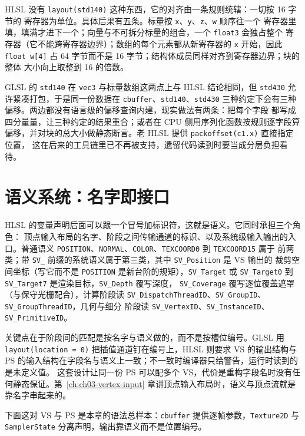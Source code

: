 \documentclass[12pt,a4paper,fontset=fandol]{ctexbook}
\newcommand{\Tp}[1]{\texttt{#1}}
\newcommand{\Lang}[1]{\textsf{#1}}
\newcommand{\DomCPU}{\Lang{CPU}}
\newcommand{\GSL}{\Lang{GLSL}}
\newcommand{\HSL}{\Lang{HLSL}}
\begin{document}
\HSL{} 没有 \Tp{layout(std140)} 这种东西，它的对齐由一条规则统辖：一切按 16 字节的
寄存器为单位。具体后果有五条。标量按 \Tp{x}、\Tp{y}、\Tp{z}、\Tp{w} 顺序往一个
寄存器里填，填满才进下一个；向量与不可拆分标量的组合，一个 \Tp{float3} 会独占整个
寄存器（它不能跨寄存器边界）；数组的每个元素都从新寄存器的 \Tp{x} 开始，因此
\Tp{float w[4]} 占 64 字节而不是 16 字节；结构体成员同样对齐到寄存器边界；块的整体
大小向上取整到 16 的倍数。

\GSL{} 的 \Tp{std140} 在 \Tp{vec3} 与标量数组这两点上与 \HSL{} 结论相同，但
\Tp{std430} 允许紧凑打包，于是同一份数据在 \Tp{cbuffer}、\Tp{std140}、\Tp{std430}
三种约定下会有三种偏移。两边都没有语言级的偏移查询内建，现实做法有两条：把每个字段
都写成四分量量，让三种约定的结果重合；或者在 \DomCPU{} 侧用序列化函数按规则逐字段算
偏移，并对块的总大小做静态断言。老 \HSL{} 提供 \Tp{packoffset(c1.x)} 直接指定位置，
这在后来的工具链里已不再被支持，遗留代码读到时要当成分层负担看待。

\section{语义系统：名字即接口}

\HSL{} 的变量声明后面可以跟一个冒号加标识符，这就是语义。它同时承担三个角色：
顶点输入布局的名字、阶段之间传输通道的标识、以及系统级输入输出的入口。普通语义
\Tp{POSITION}、\Tp{NORMAL}、\Tp{COLOR}、\Tp{TEXCOORD0} 到 \Tp{TEXCOORD15} 属于
前两类；带 \Tp{SV\_} 前缀的系统语义属于第三类，其中 \Tp{SV\_Position} 是 VS 输出的
裁剪空间坐标（写它而不是 \Tp{POSITION} 是新台阶的规矩），\Tp{SV\_Target} 或
\Tp{SV\_Target0} 到 \Tp{SV\_Target7} 是渲染目标，\Tp{SV\_Depth} 覆写深度，
\Tp{SV\_Coverage} 覆写逐位覆盖遮罩（与保守光栅配合），计算阶段读
\Tp{SV\_DispatchThreadID}、\Tp{SV\_GroupID}、\Tp{SV\_GroupThreadID}，几何与细分
阶段读 \Tp{SV\_VertexID}、\Tp{SV\_InstanceID}、\Tp{SV\_PrimitiveID}。

关键点在于阶段间的匹配是按名字与语义做的，而不是按槽位编号。\GSL{} 用
\Tp{layout(location = 0)} 把插值通道钉在编号上，\HSL{} 则要求 VS 的输出结构与 PS
的输入结构在字段名与语义上一致；不一致时编译器只给警告，运行时读到的是未定义值。
这套设计让同一份 PS 可以配多个 VS，代价是重构字段名时没有任何静态保证。第~\ref{ch:ch03-vertex-input}
章讲顶点输入布局时，语义与顶点流就是靠名字串起来的。

下面这对 VS 与 PS 是本章的语法总样本：\Tp{cbuffer} 提供逐帧参数，\Tp{Texture2D}
与 \Tp{SamplerState} 分离声明，输出靠语义而不是位置编号。
\end{document}
